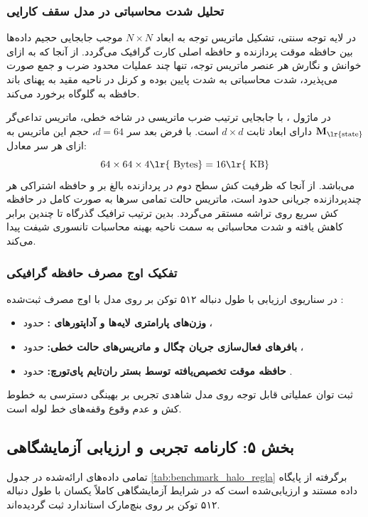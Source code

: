 \subsubsection*{تحلیل شدت محاسباتی در مدل سقف کارایی }
در لایه توجه سنتی، تشکیل ماتریس توجه به ابعاد $N \times N$ موجب جابجایی حجیم داده‌ها بین حافظه موقت پردازنده  و حافظه اصلی کارت گرافیک  می‌گردد. از آنجا که به ازای خوانش و نگارش هر عنصر ماتریس توجه، تنها چند عملیات محدود ضرب و جمع صورت می‌پذیرد، شدت محاسباتی  به شدت پایین بوده و کرنل در ناحیه مقید به پهنای باند حافظه  به گلوگاه برخورد می‌کند.

در ماژول ، با جابجایی ترتیب ضرب ماتریسی در شاخه خطی، ماتریس تداعی‌گر $\mathbf{M}_{\text{\lr{state}}}$ دارای ابعاد ثابت $d \times d$ است. با فرض بعد سر $d = 64$، حجم این ماتریس به ازای هر سر معادل:
\begin{equation}
    64 \times 64 \times 4 \text{\lr{ Bytes}} = 16 \text{\lr{ KB}}
\end{equation}
می‌باشد. از آنجا که ظرفیت کش سطح دوم  در پردازنده  بالغ بر  و حافظه اشتراکی  هر چندپردازنده جریانی  حدود  است، ماتریس حالت تمامی سرها به صورت کامل در حافظه کش سریع روی تراشه مستقر می‌گردد. بدین ترتیب ترافیک گذرگاه  تا چندین برابر کاهش یافته و شدت محاسباتی به سمت ناحیه بهینه محاسبات تانسوری  شیفت پیدا می‌کند.

\subsubsection*{تفکیک اوج مصرف حافظه گرافیکی }
در سناریوی ارزیابی با طول دنباله ۵۱۲ توکن بر روی مدل  با اوج مصرف ثبت‌شده :
\begin{itemize}
    \item \textbf{وزن‌های پارامتری لایه‌ها و آداپتورهای :} حدود ،
    \item \textbf{بافرهای فعال‌سازی جریان چگال و ماتریس‌های حالت خطی:} حدود ،
    \item \textbf{حافظه موقت تخصیص‌یافته توسط بستر ران‌تایم پای‌تورچ:} حدود .
\end{itemize}
ثبت توان عملیاتی قابل توجه  روی مدل  شاهدی تجربی بر بهینگی دسترسی به خطوط کش و عدم وقوع وقفه‌های خط لوله  است.

\subsection*{بخش ۵: کارنامه تجربی و ارزیابی آزمایشگاهی }
تمامی داده‌های ارائه‌شده در جدول \ref{tab:benchmark_halo_regla} برگرفته از پایگاه داده مستند و ارزیابی‌شده  است که در شرایط آزمایشگاهی کاملاً یکسان با طول دنباله ۵۱۲ توکن بر روی بنچ‌مارک استاندارد  ثبت گردیده‌اند.

